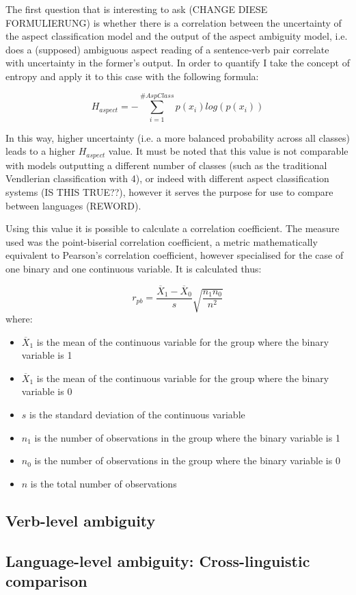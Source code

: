 The first question that is interesting to ask (CHANGE DIESE FORMULIERUNG) is whether there is a correlation between the uncertainty of the aspect classification model and the output of the aspect ambiguity model, i.e. does a (supposed) ambiguous aspect reading of a sentence-verb pair correlate with uncertainty in the former's output. In order to quantify I take the concept of entropy and apply it to this case with the following formula:

$$H_{aspect} = - \sum_{i=1}^{\#AspClass}p(x_i)log(p(x_i))$$

In this way, higher uncertainty (i.e. a more balanced probability across all classes) leads to a higher $H_{aspect}$ value. It must be noted that this value is not comparable with models outputting a different number of classes (such as the traditional Vendlerian classification with 4), or indeed with different aspect classification systems (IS THIS TRUE??), however it serves the purpose for use to compare between languages (REWORD).

Using this value it is possible to calculate a correlation coefficient. The measure used was the point-biserial correlation coefficient, a metric mathematically equivalent to Pearson's correlation coefficient, however specialised for the case of one binary and one continuous variable. It is calculated thus:

$$r_{pb} = \frac{\overline{X}_1 - \overline{X}_0}{s} \sqrt{\frac{n_1 n_0}{n^2}}$$
where:
\begin{itemize}
    \item $\overline{X}_1$ is the mean of the continuous variable for the group where the binary variable is 1
    \item $\overline{X}_1$ is the mean of the continuous variable for the group where the binary variable is 0
    \item $s$ is the standard deviation of the continuous variable
    \item $n_1$ is the number of observations in the group where the binary variable is 1
    \item $n_0$ is the number of observations in the group where the binary variable is 0
    \item $n$ is the total number of observations
\end{itemize}



\subsection{Verb-level ambiguity}

\subsection{Language-level ambiguity: Cross-linguistic comparison}
